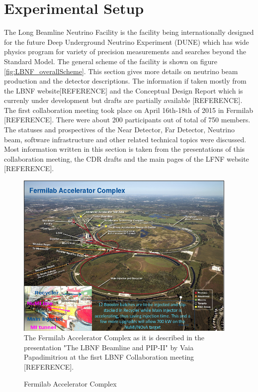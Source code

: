 
\section{Experimental Setup}

The Long Beamline Neutrino Facility is the facility being internationally designed for the future Deep Underground Neutrino Experiment (DUNE) which has wide physics program for variety of precision measurements and searches beyond the Standard Model. The general scheme of the facility is shown on figure \ref{fig:LBNF_overallScheme}. This section gives more details on neutrino beam production and the detector descriptions. The information if taken mostly from the LBNF website[REFERENCE] and the Conceptual Design Report which is currenly under development but drafts are partially available [REFERENCE].
The first collaboration meeting took place on April 16th-18th of 2015 in Fermilab [REFERENCE]. There were about 200 participants out of total of 750 members. The statuses and prospectives of the Near Detector, Far Detector, Neutrino beam, software infrastructure and other related technical topics were discussed. Most information written in this section is taken from the presentations of this collaboration meeting, the CDR drafts and the main pages of the LFNF website [REFERENCE].

\begin{figure}
\caption{Fermilab Accelerator Complex}
\label{fig:LBNF_FermilabAccComplex}
\centering
\includegraphics[width=0.95\textwidth, keepaspectratio=true]{figs/FermilabAccelerator.png}
\\The Fermilab Accelerator Complex as it is described in the presentation "The LBNF Beamline and PIP-II" by Vaia Papadimitriou at the fisrt LBNF Collaboration meeting [REFERENCE].   
\end{figure}

